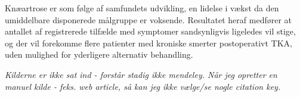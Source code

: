 Knæartrose er som følge af samfundets udvikling, en lidelse i vækst da den umiddelbare disponerede målgruppe er voksende. Resultatet heraf medfører at antallet af registrerede tilfælde med symptomer sandsynligvis ligeledes vil stige, og der vil forekomme flere patienter med kroniske smerter postoperativt TKA, uden mulighed for yderligere alternativ behandling.


\textit{Kilderne er ikke sat ind - forstår stadig ikke mendeley. Når jeg opretter en manuel kilde - feks. web article, så kan jeg ikke vælge/se nogle citation key.}

